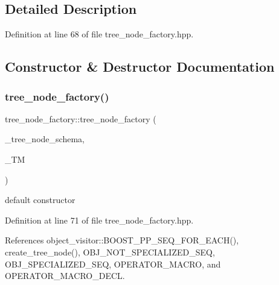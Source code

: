\subsection{Detailed Description}


Definition at line 68 of file tree\+\_\+node\+\_\+factory.\+hpp.



\subsection{Constructor \& Destructor Documentation}
\mbox{\label{structtree__node__factory_ad35b91bf63870cd88d38af674a3d4c38}} 
\subsubsection{\texorpdfstring{tree\+\_\+node\+\_\+factory()}{tree\_node\_factory()}}
{\footnotesize\ttfamily tree\+\_\+node\+\_\+factory\+::tree\+\_\+node\+\_\+factory (\begin{DoxyParamCaption}\item[{const std\+::map$<$ \hyperlink{token__interface_8hpp_a14502d0757789149f644966ca931b126}{Tree\+Vocabulary\+Token\+Types\+\_\+\+Token\+Enum}, std\+::string $>$ \&}]{\+\_\+tree\+\_\+node\+\_\+schema,  }\item[{\hyperlink{classtree__manager}{tree\+\_\+manager} \&}]{\+\_\+\+TM }\end{DoxyParamCaption})\hspace{0.3cm}{\ttfamily [inline]}}



default constructor 



Definition at line 71 of file tree\+\_\+node\+\_\+factory.\+hpp.



References object\+\_\+visitor\+::\+B\+O\+O\+S\+T\+\_\+\+P\+P\+\_\+\+S\+E\+Q\+\_\+\+F\+O\+R\+\_\+\+E\+A\+C\+H(), create\+\_\+tree\+\_\+node(), O\+B\+J\+\_\+\+N\+O\+T\+\_\+\+S\+P\+E\+C\+I\+A\+L\+I\+Z\+E\+D\+\_\+\+S\+EQ, O\+B\+J\+\_\+\+S\+P\+E\+C\+I\+A\+L\+I\+Z\+E\+D\+\_\+\+S\+EQ, O\+P\+E\+R\+A\+T\+O\+R\+\_\+\+M\+A\+C\+RO, and O\+P\+E\+R\+A\+T\+O\+R\+\_\+\+M\+A\+C\+R\+O\+\_\+\+D\+E\+CL.


